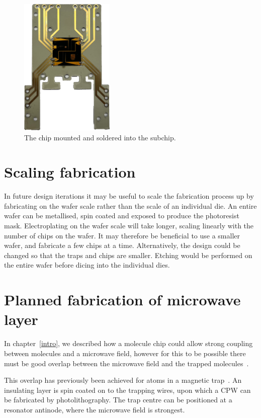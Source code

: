 \begin{figure}
  \centering
  \includegraphics[width=0.4\textwidth]{figs/fab/mount.png}
  \caption[A mounted chip]{The chip mounted and soldered into the subchip.}
  \label{fab:fig:mountedchip}
\end{figure}

\section{Scaling fabrication}

In future design iterations it may be useful to scale the fabrication process
up by fabricating on the wafer scale rather than the scale of an individual
die. An entire wafer can be metallised, spin coated and exposed to
produce the photoresist mask. Electroplating on the wafer scale will take
longer, scaling linearly with the number of chips on the wafer. It may therefore
be beneficial to use a smaller wafer, and fabricate a few chips at a time.
Alternatively, the design could be changed so that the traps and chips are
smaller. Etching would be performed on the entire wafer before dicing into the
individual dies.

\section{Planned fabrication of microwave layer}
\label{fab:planned}

In chapter~\ref{intro},
we described how a molecule chip could allow strong coupling between \CaF{}
molecules and a microwave field, however for this to be possible there must be
good overlap between the microwave field and the trapped
molecules~\cite{Andre2006}.

This overlap has previously been achieved for atoms in a magnetic
trap~\cite{Treutlein2008}. An insulating layer is spin coated on to the
trapping wires, upon which a CPW can be fabricated by photolithography. The
trap centre can be positioned at a resonator antinode, where the microwave
field is strongest.

